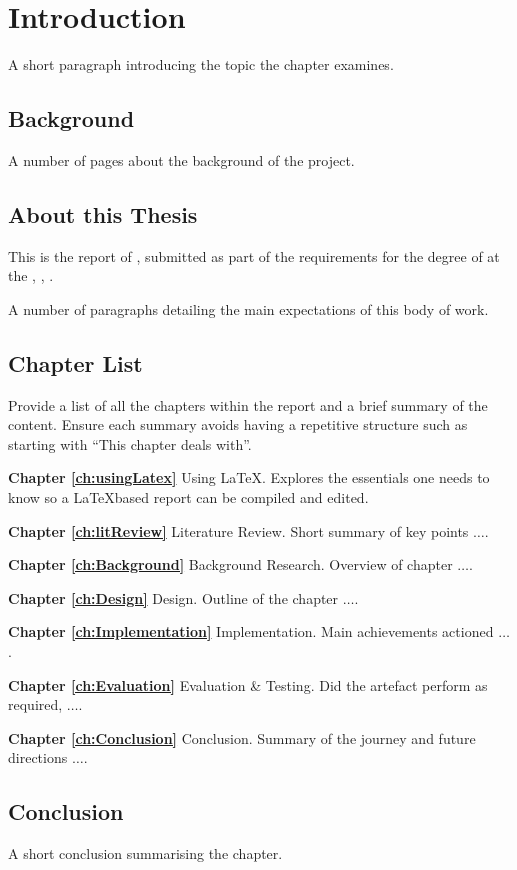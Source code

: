 \chapter{Introduction}
 \setcounter{page}{1}

A short paragraph introducing the topic the chapter examines.


\section{Background}

A number of pages about the background of the project.

\section{About this Thesis}
This is the report of \emph{\authorName}, submitted as part of the requirements for the degree of \degreeAward \space at the \dept, \university, \universityLocation.

A number of paragraphs detailing the main expectations of this body of work.


\section{Chapter List}
Provide a list of all the chapters within the report and a brief summary of the content. Ensure each summary avoids having a repetitive structure such as starting with ``This chapter deals with''.

\textbf{Chapter \ref{ch:usingLatex}} Using \LaTeX. Explores the essentials one needs to know so a \LaTeX \space based report can be compiled and edited.

\textbf{Chapter \ref{ch:litReview}} Literature Review. Short summary of key points $\ldots$.

\textbf{Chapter \ref{ch:Background}} Background Research. Overview of chapter $\ldots$.

\textbf{Chapter \ref{ch:Design}} Design. Outline of the chapter $\ldots$.

\textbf{Chapter \ref{ch:Implementation}} Implementation. Main achievements actioned $\ldots$.

\textbf{Chapter \ref{ch:Evaluation}} Evaluation \& Testing. Did the artefact perform as required, $\ldots$.

\textbf{Chapter \ref{ch:Conclusion}} Conclusion. Summary of the journey and future directions $\ldots$.


\section{Conclusion}
A short conclusion summarising the chapter.
